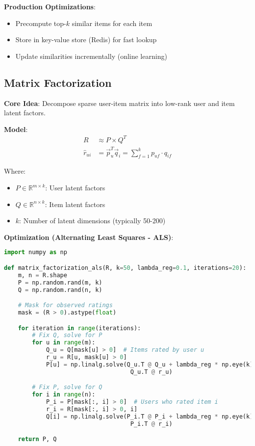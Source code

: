 \documentclass[10pt]{article}
\begin{document}
\textbf{Production Optimizations}:
\begin{itemize}[leftmargin=*]
    \item Precompute top-$k$ similar items for each item
    \item Store in key-value store (Redis) for fast lookup
    \item Update similarities incrementally (online learning)
\end{itemize}

\subsection{Matrix Factorization}

\textbf{Core Idea}: Decompose sparse user-item matrix into low-rank user and item latent factors.

\textbf{Model}:
\begin{align*}
R &\approx P \times Q^T \\
\hat{r}_{ui} &= \vec{p}_u^T \vec{q}_i = \sum_{f=1}^{k} p_{uf} \cdot q_{if}
\end{align*}

Where:
\begin{itemize}[leftmargin=*]
    \item $P \in \mathbb{R}^{m \times k}$: User latent factors
    \item $Q \in \mathbb{R}^{n \times k}$: Item latent factors
    \item $k$: Number of latent dimensions (typically 50-200)
\end{itemize}

\textbf{Optimization (Alternating Least Squares - ALS)}:
\begin{lstlisting}[language=Python]
import numpy as np

def matrix_factorization_als(R, k=50, lambda_reg=0.1, iterations=20):
    m, n = R.shape
    P = np.random.rand(m, k)
    Q = np.random.rand(n, k)

    # Mask for observed ratings
    mask = (R > 0).astype(float)

    for iteration in range(iterations):
        # Fix Q, solve for P
        for u in range(m):
            Q_u = Q[mask[u] > 0]  # Items rated by user u
            r_u = R[u, mask[u] > 0]
            P[u] = np.linalg.solve(Q_u.T @ Q_u + lambda_reg * np.eye(k),
                                    Q_u.T @ r_u)

        # Fix P, solve for Q
        for i in range(n):
            P_i = P[mask[:, i] > 0]  # Users who rated item i
            r_i = R[mask[:, i] > 0, i]
            Q[i] = np.linalg.solve(P_i.T @ P_i + lambda_reg * np.eye(k),
                                    P_i.T @ r_i)

    return P, Q
\end{lstlisting}
\end{document}
